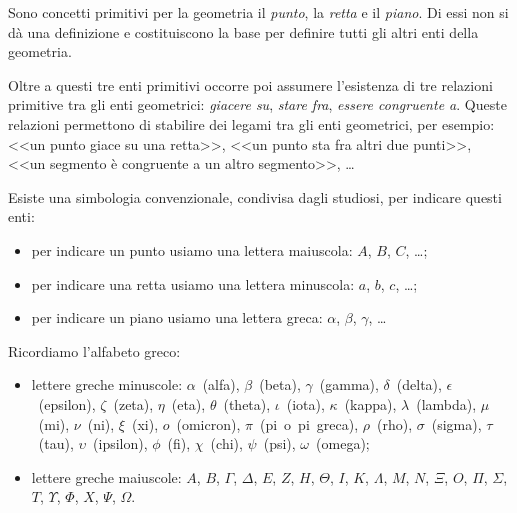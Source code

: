 Sono concetti primitivi per la geometria il \emph{punto}, la 
\emph{retta} e il \emph{piano}. Di essi non si dà una definizione e 
costituiscono la base per definire tutti gli altri enti della 
geometria.

Oltre a questi tre enti primitivi occorre poi assumere l'esistenza di 
tre relazioni primitive tra gli enti geometrici: \emph{giacere su}, 
\emph{stare fra}, \emph{essere congruente a}. Queste relazioni 
permettono di stabilire dei legami tra gli enti geometrici, per 
esempio: <<un punto giace su una retta>>, <<un punto sta fra altri 
due punti>>, <<un segmento è congruente a un altro segmento>>, \ldots

Esiste una simbologia convenzionale, condivisa dagli studiosi, per 
indicare questi enti:
\begin{itemize}
\item per indicare un punto usiamo una lettera maiuscola: $A$, $B$, 
$C$, \ldots;
\item per indicare una retta usiamo una lettera minuscola: $a$, $b$, 
$c$, \ldots;
\item per indicare un piano usiamo una lettera greca: $\alpha$, 
$\beta$, $\gamma$, \ldots
\end{itemize}

Ricordiamo l'alfabeto greco:
\begin{itemize}
\item lettere greche minuscole:  $\alpha$~(alfa),  $\beta$~(beta),  
$\gamma$~(gamma),  $\delta$~(delta), $\epsilon$~(epsilon), 
$\zeta$~(zeta), $\eta$~(eta), $\theta$~(theta),  $\iota$~(iota),  
$\kappa$~(kappa), $\lambda$~(lambda), $\mu$~(mi), $\nu$~(ni),  
$\xi$~(xi), $o$~(omicron), $\pi$~(pi~o~pi~greca), $\rho$~(rho), 
$\sigma$~(sigma), $\tau$~(tau), $\upsilon$~(ipsilon), $\phi$~(fi), 
$\chi$~(chi), $\psi$~(psi), $\omega$~(omega);
\item lettere greche maiuscole: $A$, $B$, $ \Gamma $, $ \Delta $, $ E 
$, $ Z $, $ H $, $ \Theta $, $ I $, $ K $, $ \Lambda $, $ M $, $ N $, 
$ \Xi $, $ O $, $ \Pi $, $ \Sigma $, $ T $, $ \Upsilon $, $ \Phi $, $ 
X $, $ \Psi $, $\Omega $.
\end{itemize}


